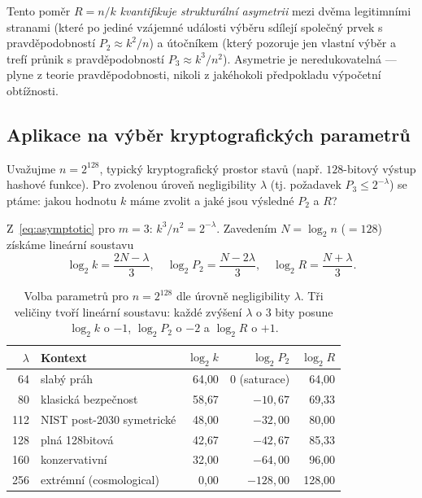 \documentclass[11pt,a4paper]{article}
\begin{document}
Tento poměr $R = n/k$ \emph{kvantifikuje strukturální asymetrii} mezi dvěma legitimními stranami (které po jediné vzájemné události výběru sdílejí společný prvek s pravděpodobností $P_2 \approx k^2/n$) a útočníkem (který pozoruje jen vlastní výběr a trefí průnik s pravděpodobností $P_3 \approx k^3/n^2$). Asymetrie je neredukovatelná --- plyne z teorie pravděpodobnosti, nikoli z jakéhokoli předpokladu výpočetní obtížnosti.

\subsection{Aplikace na výběr kryptografických parametrů}\label{sec:crypto-application}

Uvažujme $n = 2^{128}$, typický kryptografický prostor stavů (např. $128$-bitový výstup hashové funkce). Pro zvolenou úroveň negligibility $\lambda$ (tj. požadavek $P_3 \leq 2^{-\lambda}$) se ptáme: jakou hodnotu $k$ máme zvolit a jaké jsou výsledné $P_2$ a $R$?

Z~\eqref{eq:asymptotic} pro $m = 3$: $k^3 / n^2 = 2^{-\lambda}$. Zavedením $N = \log_2 n$ ($= 128$) získáme lineární soustavu
\begin{equation}\label{eq:linear-system}
\log_2 k = \frac{2N - \lambda}{3}, \quad \log_2 P_2 = \frac{N - 2\lambda}{3}, \quad \log_2 R = \frac{N + \lambda}{3}.
\end{equation}

\begin{table}[ht]
\centering
\small
\begin{tabular}{rlrrr}
\toprule
$\lambda$ & Kontext & $\log_2 k$ & $\log_2 P_2$ & $\log_2 R$ \\
\midrule
64 & slabý práh & 64{,}00 & 0 (saturace) & 64{,}00 \\
80 & klasická bezpečnost & 58{,}67 & $-10{,}67$ & 69{,}33 \\
112 & NIST post-2030 symetrické & 48{,}00 & $-32{,}00$ & 80{,}00 \\
128 & plná 128bitová & 42{,}67 & $-42{,}67$ & 85{,}33 \\
160 & konzervativní & 32{,}00 & $-64{,}00$ & 96{,}00 \\
256 & extrémní (cosmological) & 0{,}00 & $-128{,}00$ & 128{,}00 \\
\bottomrule
\end{tabular}
\caption{Volba parametrů pro $n = 2^{128}$ dle úrovně negligibility $\lambda$. Tři veličiny tvoří lineární soustavu: každé zvýšení $\lambda$ o $3$ bity posune $\log_2 k$ o $-1$, $\log_2 P_2$ o $-2$ a $\log_2 R$ o $+1$.}
\label{tab:lambda-tradeoff}
\end{table}
\end{document}
